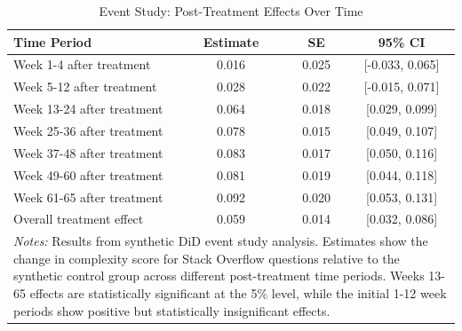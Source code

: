 \begin{table}[H]
    \centering
    \caption{Event Study: Post-Treatment Effects Over Time}
    \label{tab:app-csscore_event_study}
    \begin{tabular}{lccc}
    \toprule
    Time Period & Estimate & SE & 95\% CI \\
    \midrule
    Week 1-4 after treatment   & 0.016 & 0.025 & [-0.033, 0.065] \\
    Week 5-12 after treatment  & 0.028 & 0.022 & [-0.015, 0.071] \\
    Week 13-24 after treatment & 0.064 & 0.018 & [0.029, 0.099] \\
    Week 25-36 after treatment & 0.078 & 0.015 & [0.049, 0.107] \\
    Week 37-48 after treatment & 0.083 & 0.017 & [0.050, 0.116] \\
    Week 49-60 after treatment & 0.081 & 0.019 & [0.044, 0.118] \\
    Week 61-65 after treatment & 0.092 & 0.020 & [0.053, 0.131] \\
    \midrule
    Overall treatment effect & 0.059 & 0.014 & [0.032, 0.086] \\
    \bottomrule
    \multicolumn{4}{p{0.85\linewidth}}{\footnotesize \textit{Notes:} Results from synthetic DiD event study analysis. Estimates show the change in complexity score for Stack Overflow questions relative to the synthetic control group across different post-treatment time periods. Weeks 13-65 effects are statistically significant at the 5\% level, while the initial 1-12 week periods show positive but statistically insignificant effects.} \\
    \end{tabular}
\end{table}
